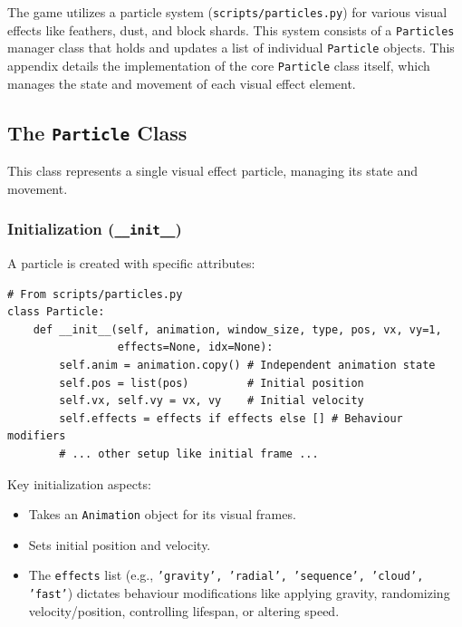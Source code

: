 \documentclass[11pt, a4paper]{article}
\begin{document}
The game utilizes a particle system (\texttt{scripts/particles.py}) for various visual effects like feathers, dust, and block shards. This system consists of a \texttt{Particles} manager class that holds and updates a list of individual \texttt{Particle} objects. This appendix details the implementation of the core \texttt{Particle} class itself, which manages the state and movement of each visual effect element.

\subsection{The \texttt{Particle} Class}

This class represents a single visual effect particle, managing its state and movement.

\subsubsection{Initialization (\texttt{\_\_init\_\_})}

A particle is created with specific attributes:

\begin{lstlisting}[caption={Particle Class \_\_init\_\_ Snippet}, label={lst:particle_init_short}]
# From scripts/particles.py
class Particle:
    def __init__(self, animation, window_size, type, pos, vx, vy=1, 
                 effects=None, idx=None):
        self.anim = animation.copy() # Independent animation state
        self.pos = list(pos)         # Initial position
        self.vx, self.vy = vx, vy    # Initial velocity
        self.effects = effects if effects else [] # Behaviour modifiers
        # ... other setup like initial frame ...
\end{lstlisting}

Key initialization aspects:

\begin{itemize}

    \item Takes an \texttt{Animation} object for its visual frames.
    
    \item Sets initial position and velocity.
    
    \item The \texttt{effects} list (e.g., \texttt{'gravity', 'radial', 'sequence', 'cloud', 'fast'}) dictates behaviour modifications like applying gravity, randomizing velocity/position, controlling lifespan, or altering speed.

\end{itemize}
\end{document}
